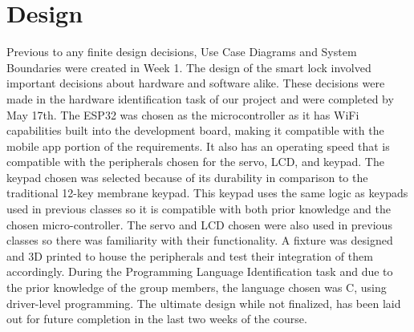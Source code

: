 \chapter{Design}
Previous to any finite design decisions, Use Case Diagrams and System Boundaries were created in Week 1. The design of the smart lock involved important decisions about hardware and software alike. These decisions were made in the hardware identification task of our project and were completed by May 17th. The ESP32 was chosen as the microcontroller as it has WiFi capabilities built into the development board, making it compatible with the mobile app portion of the requirements. It also has an operating speed that is compatible with the peripherals chosen for the servo, LCD, and keypad. The keypad chosen was selected because of its durability in comparison to the traditional 12-key membrane keypad. This keypad uses the same logic as keypads used in previous classes so it is compatible with both prior knowledge and the chosen micro-controller. The servo and LCD chosen were also used in previous classes so there was familiarity with their functionality. A fixture was designed and 3D printed to house the peripherals and test their integration of them accordingly. During the Programming Language Identification task and due to the prior knowledge of the group members, the language chosen was C, using driver-level programming. The ultimate design while not finalized, has been laid out for future completion in the last two weeks of the course.
